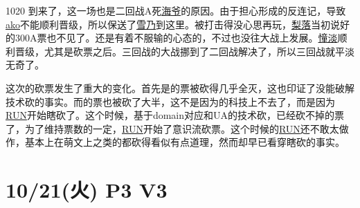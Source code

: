 
1020 到来了，这一场也是二回战A死\uline{海爷}的原因。由于担心形成的反连记，导致\uline{ako}不能顺利晋级，所以保送了\uline{雪乃}到这里。被打击得没心思再玩，\uline{梨落}当初说好的300A票也不见了。还是有着不服输的心态的，不过也没往大战上发展。\uline{憧}\uline{淡}顺利晋级，尤其是砍票之后。三回战的大战挪到了二回战解决了，所以三回战就平淡无奇了。

\newpage

这次的砍票发生了重大的变化。首先是的票被砍得几乎全灭，这也印证了没能破解技术砍的事实。而的票也被砍了大半，这不是因为的科技上不去了，而是因为\uline{RUN}开始瞎砍了。这个时候，基于domain对应和UA的技术砍，已经砍不掉的票了，为了维持票数的一定，\uline{RUN}开始了意识流砍票。这个时候的\uline{RUN}还不敢太做作，基本上在萌文上之类的都砍得看似有点道理，然而却早已看穿瞎砍的事实。

\section{10/21(火) P3 V3}

